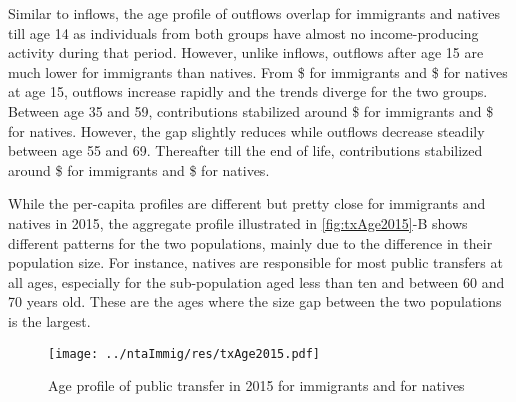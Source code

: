 \vspace{0.7em}\par
Similar to inflows, the age profile of outflows overlap for immigrants and natives till age 14 as individuals from both groups have almost no income-producing activity during that period.
However, unlike inflows, outflows after age 15 are much lower for immigrants than natives.
From \$ for immigrants and \$ for natives at age 15, outflows increase rapidly and the trends diverge for the two groups.
Between age 35 and 59, contributions stabilized around \$ for immigrants and \$ for natives.
However, the gap slightly reduces while outflows decrease steadily between age 55 and 69.
Thereafter till the end of life, contributions stabilized around \$ for immigrants and \$ for natives.

\vspace{0.7em}\par
While the per-capita profiles are different but pretty close for immigrants and natives in 2015, the aggregate profile illustrated in \autoref{fig:txAge2015}-B shows different patterns for the two populations, mainly due to the difference in their population size.
For instance, natives are responsible for most public transfers at all ages, especially for the sub-population aged less than ten and between 60 and 70 years old. These are the ages where the size gap between the two populations is the largest.

\begin{figure}[H]%
  \caption{Age profile of public transfer in 2015 for immigrants and for natives}
  \texttt{[image: ../ntaImmig/res/txAge2015.pdf]}%
  \label{fig:txAge2015}%
\end{figure}%

